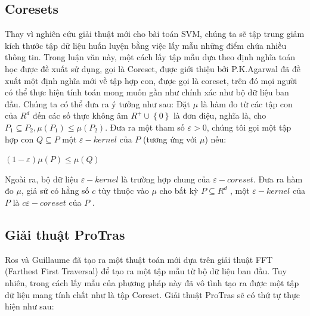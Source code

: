 \documentclass[a4paper, 12pt, oneside]{report}
\begin{document}
\subsection{Coresets}
Thay vì nghiên cứu giải thuật mới cho bài toán SVM, chúng ta sẽ tập trung giảm kích thước tập dữ liệu huấn luyện bằng việc lấy mẫu những điểm chứa nhiều thông tin. Trong luận văn này, một cách lấy tập mẫu dựa theo định nghĩa toán học được đề xuất sử dụng, gọi là Coreset, được giới thiệu bởi P.K.Agarwal đã đề xuất một định nghĩa mới về tập hợp con, được gọi là coreset, trên đó mọi người có thể thực hiện tính toán mong muốn gần như chính xác như bộ dữ liệu ban đầu. Chúng ta có thể đưa ra ý tưởng như sau: Đặt $\mu$ là hàm đo từ các tập con của $R^{d}$ đến các số thực không âm $R^{+} \cup \left \{ 0 \right \}$ là đơn điệu, nghĩa là, cho $P_{1}\subseteq P_{2},\mu \left ( {P_{1}}  \right ) \leq \mu \left ( {P_{2}}  \right )$. Đưa ra một tham số $\varepsilon > 0$, chúng tôi gọi một tập hợp con $Q\subseteq P$ một $\varepsilon-kernel$ của $P$ (tương ứng với $\mu$) nếu:\\
\begin{mybox}
\begin{center}
$\left ( 1-\varepsilon  \right )\mu \left ( P \right ) \leq \mu \left ( Q \right )$
\end{center} 
\end{mybox}
Ngoài ra, bộ dữ liệu $\varepsilon-kernel$ là trường hợp chung của $\varepsilon-coreset$. Đưa ra hàm đo $\mu$, giả sử có hằng số $c$ tùy thuộc vào $\mu$ cho bất kỳ $P\subseteq R^{d}$ , một $\varepsilon-kernel$ của $P$ là $c\varepsilon-coreset$ của $P$ .
\subsection{Giải thuật ProTras}
Ros và Guillaume đã tạo ra một thuật toán mới dựa trên giải thuật FFT (Farthest First Traversal) để tạo ra một tập mẫu từ bộ dữ liệu ban đầu. Tuy nhiên, trong cách lấy mẫu của phương pháp này đã vô tình tạo ra được một tập dữ liệu mang tính chất như là tập Coreset. Giải thuật ProTras sẽ có thứ tự thực hiện như sau:
\end{document}
